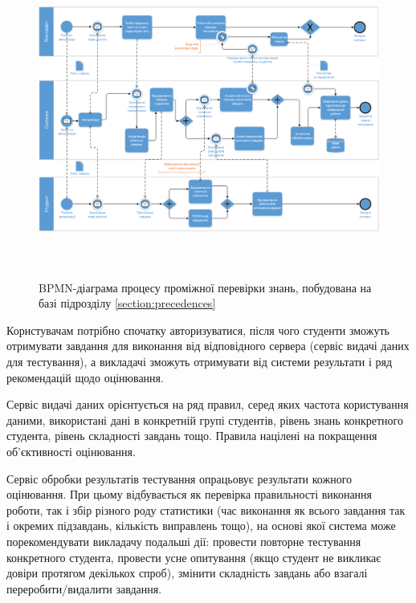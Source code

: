\begin{figure}[h!]
    \center\includegraphics[height=28em,angle=-90]{images/bpmn_tests.png}
    \caption{BPMN-діаграма процесу проміжної перевірки знань,
    побудована на базі підрозділу \ref{section:precedences}}
    \label{fig:bpmn_tests}
\end{figure}

Користувачам потрібно спочатку авторизуватися, після чого студенти зможуть
отримувати завдання для виконання від відповідного сервера (сервіс видачі даних
для тестування), а викладачі зможуть отримувати від системи результати і ряд
рекомендацій щодо оцінювання.

Сервіс видачі даних орієнтується на ряд правил, серед яких частота користування
даними, використані дані в конкретній групі студентів, рівень знань конкретного
студента, рівень складності завдань тощо.
Правила націлені на покращення об’єктивності оцінювання.

Сервіс обробки результатів тестування опрацьовує результати кожного оцінювання.
При цьому відбувається як перевірка правильності виконання роботи, так і збір
різного роду статистики (час виконання як всього завдання так і окремих
підзавдань, кількість виправлень тощо), на основі якої система може
порекомендувати викладачу подальші дії: провести повторне тестування
конкретного студента, провести усне опитування (якщо студент не викликає довіри
протягом декількох спроб), змінити складність завдань або взагалі
переробити/видалити завдання.


